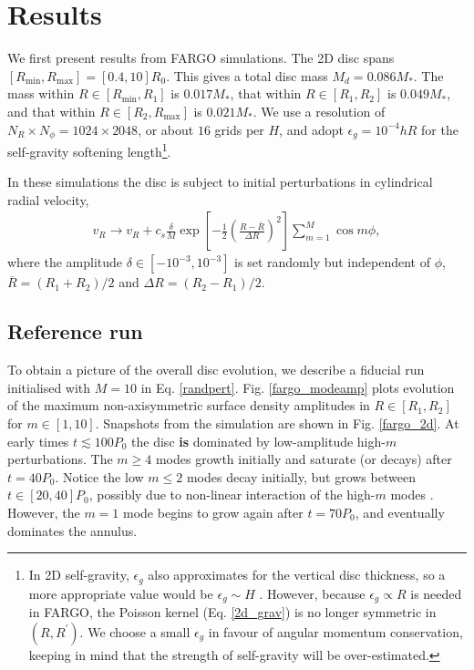 \section{Results}\label{results2d}
We first present results from FARGO simulations. The 2D disc spans
$[R_\mathrm{min}, R_\mathrm{max}] = [0.4,10]R_0$. This gives a total
disc mass $M_{d}=0.086M_*$. The mass within
$R\in[R_\mathrm{min},R_{1}]$ is $0.017M_*$, that within
$R\in[R_{1},R_{2}]$ is $0.049M_*$, and that within
$R\in[R_{2},R_\mathrm{max}]$ is $0.021M_*$. We use a resolution of
$N_R\times N_\phi = 1024\times 2048$, or about $16$ grids per $H$, and
adopt $\epsilon_g=10^{-4}hR$ for the   
self-gravity softening length\footnote{In 2D self-gravity, $\epsilon_g$ also
  approximates for the vertical disc thickness, so a more appropriate
  value would be $\epsilon_g\sim H$ \citep{muller12}. However, because
  $\epsilon_g\propto R$ is needed in FARGO, the Poisson kernel
  (Eq. \ref{2d_grav}) is no longer symmetric in $(R,R^\prime)$. We
  choose a small  
  $\epsilon_g$ in favour of angular momentum conservation, keeping in
  mind that the strength of self-gravity will be over-estimated.}.

In these simulations the disc is subject to initial perturbations in 
cylindrical radial velocity, 
\begin{align}\label{randpert}
  v_R \to v_R+ c_s\frac{\delta}{M}
  \exp{\left[-\frac{1}{2}\left(\frac{R-\overline{R}}{\Delta 
          R}\right)^2\right]}\sum_{m=1}^M\cos{m\phi},
\end{align}
where the amplitude $\delta\in[-10^{-3},10^{-3}]$ is set randomly but
independent of $\phi$, $\overline{R} = (R_{1}+R_{2})/2$
and $\Delta R = (R_{2}-R_{1})/2$. 

\subsection{Reference run}
To obtain a picture of the overall disc evolution, we describe a 
fiducial run initialised with $M=10$ in Eq. \ref{randpert}. 
Fig. \ref{fargo_modeamp} plots evolution of the maximum 
non-axisymmetric surface density amplitudes in $R\in[R_{1},R_{2}]$
for $m\in[1,10]$. Snapshots from the simulation are shown in
Fig. \ref{fargo_2d}. 
At early times $t\lesssim100P_0$ the disc {\bf is } 
dominated by low-amplitude high-$m$ perturbations. The $m\geq4$ modes
growth initially and saturate (or decays) after $t=40P_0$. Notice the
low $m\leq 2$ modes decay initially, but grows between $t\in[20,40]P_0$,
possibly due to non-linear interaction of the high-$m$ modes  
\citep{laughlin96,laughlin97}. However, the $m=1$ mode begins to grow
again after $t=70P_0$, and eventually dominates the annulus. 

